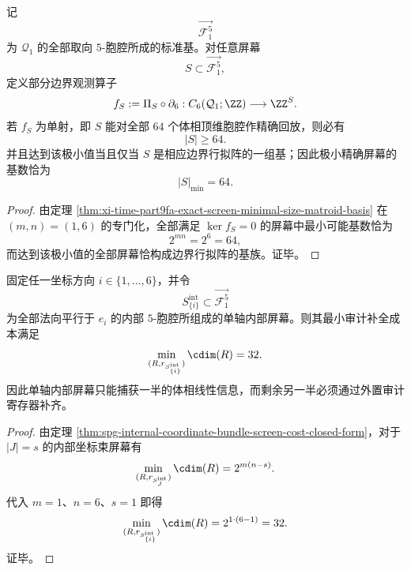 \begin{theorem}\label{thm:conclusion-window6-exact-screen-minimal-size-64}
记
\[
\overrightarrow{\mathcal F_1^5}
\]
为 \(\mathcal Q_1\) 的全部取向 \(5\)-胞腔所成的标准基。对任意屏幕
\[
S\subset \overrightarrow{\mathcal F_1^5},
\]
定义部分边界观测算子
\[
f_S:=\Pi_S\circ \partial_6:
C_6(\mathcal Q_1;\ZZ)\longrightarrow \ZZ^S.
\]
若 \(f_S\) 为单射，即 \(S\) 能对全部 \(64\) 个体相顶维胞腔作精确回放，则必有
\[
|S|\ge 64.
\]
并且达到该极小值当且仅当 \(S\) 是相应边界行拟阵的一组基；因此极小精确屏幕的基数恰为
\[
|S|_{\min}=64.
\]
\end{theorem}
\begin{proof}
由定理 \ref{thm:xi-time-part9fa-exact-screen-minimal-size-matroid-basis} 在 \((m,n)=(1,6)\) 的专门化，全部满足 \(\ker f_S=0\) 的屏幕中最小可能基数恰为
\[
2^{mn}=2^6=64,
\]
而达到该极小值的全部屏幕恰构成边界行拟阵的基族。证毕。
\end{proof}

\begin{corollary}\label{cor:conclusion-window6-single-axis-screen-blind-rank-32}
固定任一坐标方向 \(i\in\{1,\dots,6\}\)，并令
\[
S_{\{i\}}^{\mathrm{int}}\subset \overrightarrow{\mathcal F_1^5}
\]
为全部法向平行于 \(e_i\) 的内部 \(5\)-胞腔所组成的单轴内部屏幕。则其最小审计补全成本满足
\[
\min_{(R,r_{S_{\{i\}}^{\mathrm{int}}})}\cdim(R)=32.
\]
因此单轴内部屏幕只能捕获一半的体相线性信息，而剩余另一半必须通过外置审计寄存器补齐。
\end{corollary}
\begin{proof}
由定理 \ref{thm:spg-internal-coordinate-bundle-screen-cost-closed-form}，对于 \(|J|=s\) 的内部坐标束屏幕有
\[
\min_{(R,r_{S_J^{\mathrm{int}}})}\cdim(R)=2^{m(n-s)}.
\]
代入 \(m=1\)、\(n=6\)、\(s=1\) 即得
\[
\min_{(R,r_{S_{\{i\}}^{\mathrm{int}}})}\cdim(R)=2^{1\cdot(6-1)}=32.
\]
证毕。
\end{proof}



